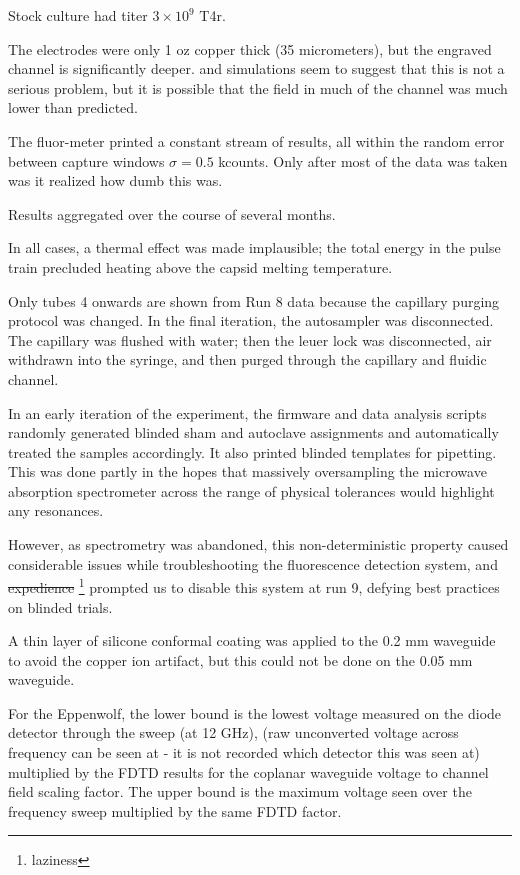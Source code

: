 \documentclass[paper.tex]{subfiles}
\begin{document}
\begin{multicols}{1}
Stock culture had titer $3\times 10^9$ T4r.

The electrodes were only 1 oz copper thick (35 micrometers), but the engraved channel is significantly deeper. 
\cite{Nanosecond2006} and simulations seem to suggest that this is not a serious problem, but it is possible that the field in much of the channel was much lower than predicted.

The fluor-meter printed a constant stream of results, all within the random error between capture windows $\sigma=0.5$ kcounts. Only after most of the data was taken was it realized how dumb this was.

Results aggregated over the course of several months.

In all cases, a thermal effect was made implausible; the total energy in the pulse train precluded heating above the capsid melting temperature\cite{Effects1951}.

Only tubes 4 onwards are shown from Run 8 data because the capillary purging protocol was changed. In the final iteration, the autosampler was disconnected. The capillary was flushed with water; then the leuer lock was disconnected, air withdrawn into the syringe, and then purged through the capillary and fluidic channel.

In an early iteration of the experiment, the firmware and data analysis scripts randomly generated blinded sham and autoclave assignments and automatically treated the samples accordingly. It also printed blinded templates for pipetting. This was done partly in the hopes that massively oversampling the microwave absorption spectrometer across the range of physical tolerances would highlight any resonances.\cite{first2000} 

However, as spectrometry was abandoned, this non-deterministic property caused considerable issues while troubleshooting the fluorescence detection system, and \st{expedience} \footnote{laziness} prompted us to disable this system at run 9, defying best practices on blinded trials.

A thin layer of silicone conformal coating was applied to the 0.2 mm waveguide to avoid the copper ion artifact, but this could not be done on the 0.05 mm waveguide.


For the Eppenwolf, the lower bound is the lowest voltage measured on the diode detector through the sweep (at 12 GHz), (raw unconverted voltage across frequency can be seen at - it is not recorded which detector this was seen at) multiplied by the FDTD results for the coplanar waveguide voltage to channel field scaling factor. The upper bound is the maximum voltage seen over the frequency sweep multiplied by the same FDTD factor.


\end{multicols}
\end{document}
